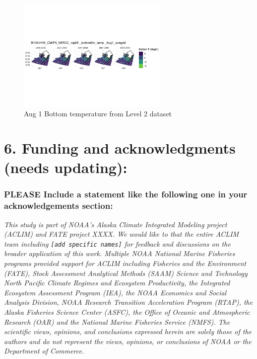 \documentclass[
]{article}
\begin{document}
\begin{figure}
\centering
\includegraphics[width=0.65\textwidth,height=\textheight]{Figs/sub_grid_mn_BT_Aug1.jpg}
\caption{Aug 1 Bottom temperature from Level 2 dataset}
\end{figure}

\hypertarget{funding-and-acknowledgments-needs-updating}{%
\section{6. Funding and acknowledgments (needs
updating):}\label{funding-and-acknowledgments-needs-updating}}

\hypertarget{please-include-a-statement-like-the-following-one-in-your-acknowledgements-section}{%
\subsubsection{PLEASE Include a statement like the following one in your
acknowledgements
section:}\label{please-include-a-statement-like-the-following-one-in-your-acknowledgements-section}}

\emph{This study is part of NOAA's Alaska Climate Integrated Modeling
project (ACLIM) and FATE project XXXX. We would like to that the entire
ACLIM team including \texttt{{[}add\ specific\ names{]}} for feedback
and discussions on the broader application of this work. Multiple NOAA
National Marine Fisheries programs provided support for ACLIM including
Fisheries and the Environment (FATE), Stock Assessment Analytical
Methods (SAAM) Science and Technology North Pacific Climate Regimes and
Ecosystem Productivity, the Integrated Ecosystem Assessment Program
(IEA), the NOAA Economics and Social Analysis Division, NOAA Research
Transition Acceleration Program (RTAP), the Alaska Fisheries Science
Center (ASFC), the Office of Oceanic and Atmospheric Research (OAR) and
the National Marine Fisheries Service (NMFS). The scientific views,
opinions, and conclusions expressed herein are solely those of the
authors and do not represent the views, opinions, or conclusions of NOAA
or the Department of Commerce.}
\end{document}
